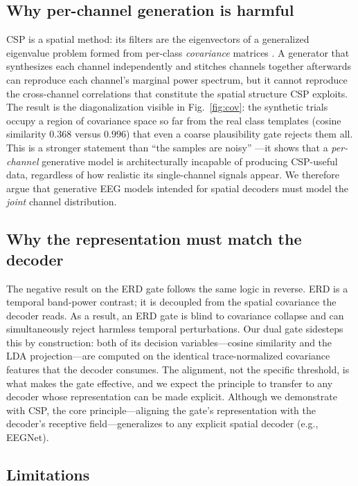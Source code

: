 \documentclass[conference]{IEEEtran}
\begin{document}
\subsection{Why per-channel generation is harmful}
\label{sec:why}

CSP is a spatial method: its filters are the eigenvectors of a generalized
eigenvalue problem formed from per-class \emph{covariance} matrices
\cite{ramoser2000optimal,blankertz2008optimizing}. A generator that synthesizes
each channel independently and stitches channels together afterwards can
reproduce each channel's marginal power spectrum, but it cannot reproduce the
cross-channel correlations that constitute the spatial structure CSP exploits.
The result is the diagonalization visible in Fig.~\ref{fig:cov}: the synthetic
trials occupy a region of covariance space so far from the real class templates
(cosine similarity $0.368$ versus $0.996$) that even a coarse plausibility gate
rejects them all. This is a stronger statement than ``the samples are noisy''
---it shows that a \emph{per-channel} generative model is architecturally
incapable of producing CSP-useful data, regardless of how realistic its
single-channel signals appear. We therefore argue that generative EEG models
intended for spatial decoders must model the \emph{joint} channel distribution.

\subsection{Why the representation must match the decoder}
\label{sec:repr}

The negative result on the ERD gate follows the same logic in reverse. ERD is a
temporal band-power contrast; it is decoupled from the spatial covariance the
decoder reads. As a result, an ERD gate is blind to covariance collapse and can
simultaneously reject harmless temporal perturbations. Our dual gate sidesteps
this by construction: both of its decision variables---cosine similarity and the
LDA projection---are computed on the identical trace-normalized covariance
features that the decoder consumes. The alignment, not the specific threshold,
is what makes the gate effective, and we expect the principle to transfer to any
decoder whose representation can be made explicit. Although we demonstrate with
CSP, the core principle---aligning the gate's representation with the decoder's
receptive field---generalizes to any explicit spatial decoder (e.g., EEGNet).

\subsection{Limitations}
\label{sec:limitations}
\end{document}
